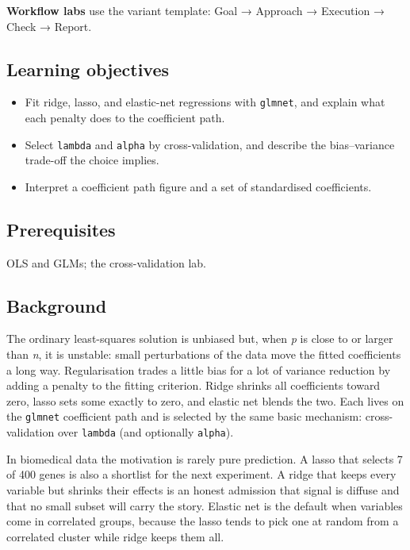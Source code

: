 \documentclass[
]{article}
\author{}
\date{\vspace{-2.5em}}
\providecommand{\tightlist}{%
  \setlength{\itemsep}{0pt}\setlength{\parskip}{0pt}}
\begin{document}
\textbf{Workflow labs} use the variant template: Goal → Approach →
Execution → Check → Report.

\subsection{Learning objectives}\label{learning-objectives}

\begin{itemize}
\tightlist
\item
  Fit ridge, lasso, and elastic-net regressions with \texttt{glmnet},
  and explain what each penalty does to the coefficient path.
\item
  Select \texttt{lambda} and \texttt{alpha} by cross-validation, and
  describe the bias--variance trade-off the choice implies.
\item
  Interpret a coefficient path figure and a set of standardised
  coefficients.
\end{itemize}

\subsection{Prerequisites}\label{prerequisites}

OLS and GLMs; the cross-validation lab.

\subsection{Background}\label{background}

The ordinary least-squares solution is unbiased but, when \emph{p} is
close to or larger than \emph{n}, it is unstable: small perturbations of
the data move the fitted coefficients a long way. Regularisation trades
a little bias for a lot of variance reduction by adding a penalty to the
fitting criterion. Ridge shrinks all coefficients toward zero, lasso
sets some exactly to zero, and elastic net blends the two. Each lives on
the \texttt{glmnet} coefficient path and is selected by the same basic
mechanism: cross-validation over \texttt{lambda} (and optionally
\texttt{alpha}).

In biomedical data the motivation is rarely pure prediction. A lasso
that selects 7 of 400 genes is also a shortlist for the next experiment.
A ridge that keeps every variable but shrinks their effects is an honest
admission that signal is diffuse and that no small subset will carry the
story. Elastic net is the default when variables come in correlated
groups, because the lasso tends to pick one at random from a correlated
cluster while ridge keeps them all.
\end{document}
